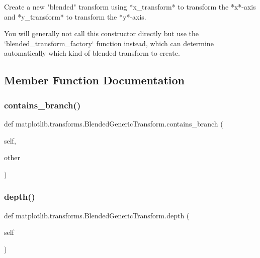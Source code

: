 \begin{DoxyVerb}Create a new "blended" transform using *x_transform* to transform the
*x*-axis and *y_transform* to transform the *y*-axis.

You will generally not call this constructor directly but use the
`blended_transform_factory` function instead, which can determine
automatically which kind of blended transform to create.
\end{DoxyVerb}
 

\subsection{Member Function Documentation}
\mbox{\label{classmatplotlib_1_1transforms_1_1BlendedGenericTransform_aac2192c8b2ec4949638f89d58936c3f4}} 
\subsubsection{\texorpdfstring{contains\+\_\+branch()}{contains\_branch()}}
{\footnotesize\ttfamily def matplotlib.\+transforms.\+Blended\+Generic\+Transform.\+contains\+\_\+branch (\begin{DoxyParamCaption}\item[{}]{self,  }\item[{}]{other }\end{DoxyParamCaption})}

\mbox{\label{classmatplotlib_1_1transforms_1_1BlendedGenericTransform_aa90d3aa8274240b48e0a74d5cb27ae56}} 
\subsubsection{\texorpdfstring{depth()}{depth()}}
{\footnotesize\ttfamily def matplotlib.\+transforms.\+Blended\+Generic\+Transform.\+depth (\begin{DoxyParamCaption}\item[{}]{self }\end{DoxyParamCaption})}

